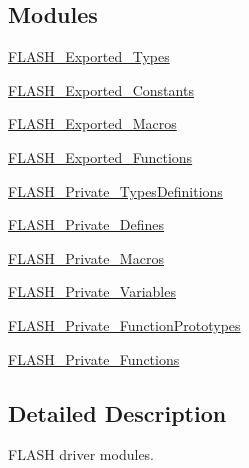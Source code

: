 \subsection*{Modules}
\begin{DoxyCompactItemize}
\item 
\hyperlink{group___f_l_a_s_h___exported___types}{F\+L\+A\+S\+H\+\_\+\+Exported\+\_\+\+Types}
\item 
\hyperlink{group___f_l_a_s_h___exported___constants}{F\+L\+A\+S\+H\+\_\+\+Exported\+\_\+\+Constants}
\item 
\hyperlink{group___f_l_a_s_h___exported___macros}{F\+L\+A\+S\+H\+\_\+\+Exported\+\_\+\+Macros}
\item 
\hyperlink{group___f_l_a_s_h___exported___functions}{F\+L\+A\+S\+H\+\_\+\+Exported\+\_\+\+Functions}
\item 
\hyperlink{group___f_l_a_s_h___private___types_definitions}{F\+L\+A\+S\+H\+\_\+\+Private\+\_\+\+Types\+Definitions}
\item 
\hyperlink{group___f_l_a_s_h___private___defines}{F\+L\+A\+S\+H\+\_\+\+Private\+\_\+\+Defines}
\item 
\hyperlink{group___f_l_a_s_h___private___macros}{F\+L\+A\+S\+H\+\_\+\+Private\+\_\+\+Macros}
\item 
\hyperlink{group___f_l_a_s_h___private___variables}{F\+L\+A\+S\+H\+\_\+\+Private\+\_\+\+Variables}
\item 
\hyperlink{group___f_l_a_s_h___private___function_prototypes}{F\+L\+A\+S\+H\+\_\+\+Private\+\_\+\+Function\+Prototypes}
\item 
\hyperlink{group___f_l_a_s_h___private___functions}{F\+L\+A\+S\+H\+\_\+\+Private\+\_\+\+Functions}
\end{DoxyCompactItemize}


\subsection{Detailed Description}
F\+L\+A\+SH driver modules. 


